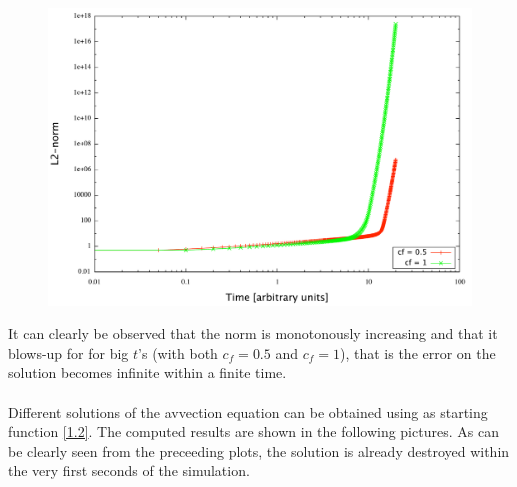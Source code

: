 \documentclass[11pt,a4paper]{article}
\begin{document}
\begin{figure}[!h]
\centering
{\includegraphics[scale=0.4]{L2norm_ftcs}}
\end{figure}
It can clearly be observed that the norm is monotonously increasing and that it blows-up for for big $t$'s (with both $c_f=0.5$ and $c_f=1$), that is the error on the solution becomes infinite within a finite time. 
\\ \ \\
Different solutions of the avvection equation can be obtained using as starting function \eqref{1.2}. The computed results are shown in the following pictures. As can be clearly seen from the preceeding plots, the solution is already destroyed within the very first seconds of the simulation. 
\end{document}

